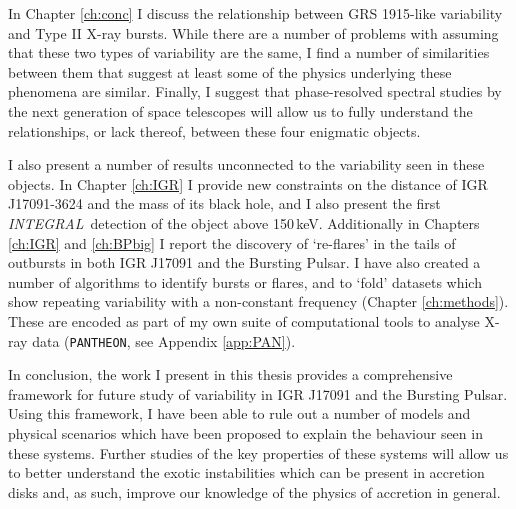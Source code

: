 \par In Chapter \ref{ch:conc} I discuss the relationship between GRS 1915-like variability and Type II X-ray bursts.  While there are a number of problems with assuming that these two types of variability are the same, I find a number of similarities between them that suggest at least some of the physics underlying these phenomena are similar.  Finally, I suggest that phase-resolved spectral studies by the next generation of space telescopes will allow us to fully understand the relationships, or lack thereof, between these four enigmatic objects.
\par I also present a number of results unconnected to the variability seen in these objects.  In Chapter \ref{ch:IGR} I provide new constraints on the distance of IGR J17091-3624 and the mass of its black hole, and I also present the first \textit{INTEGRAL}\indexintegral\ detection of the object above 150\,keV.  Additionally in Chapters \ref{ch:IGR} and \ref{ch:BPbig} I report the discovery of `re-flares' in the tails of outbursts in both IGR J17091 and the Bursting Pulsar.  I have also created a number of algorithms to identify bursts or flares, and to `fold' datasets which show repeating variability with a non-constant frequency (Chapter \ref{ch:methods}).  These are encoded as part of my own suite of computational tools to analyse X-ray data (\texttt{PANTHEON}, see Appendix \ref{app:PAN}).
\par In conclusion, the work I present in this thesis provides a comprehensive framework for future study of variability in IGR J17091 and the Bursting Pulsar.  Using this framework, I have been able to rule out a number of models and physical scenarios which have been proposed to explain the behaviour seen in these systems.  Further studies of the key properties of these systems will allow us to better understand the exotic instabilities which can be present in accretion disks and, as such, improve our knowledge of the physics of accretion in general.